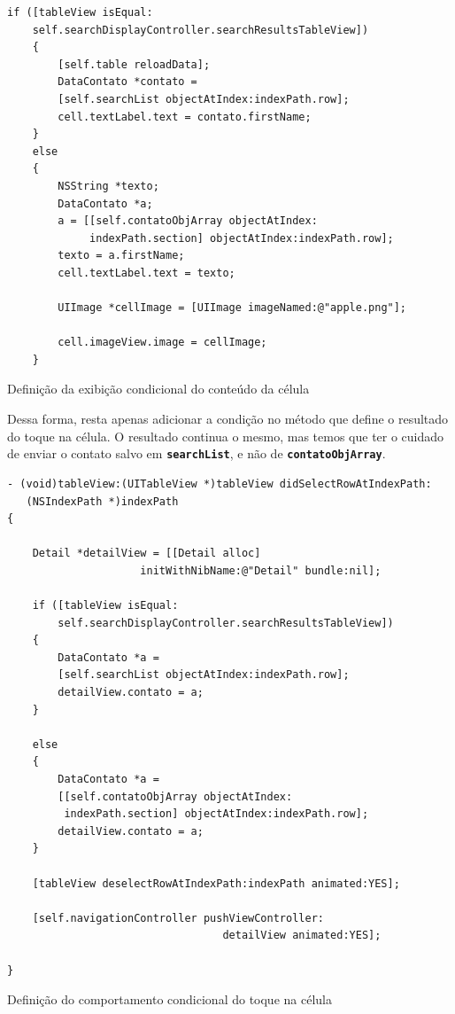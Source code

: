 \documentclass[a4paper,12pt,brazil,oneside]{book}
\begin{document}
\begin{listing}[H]
\begin{verbatim}
if ([tableView isEqual:
    self.searchDisplayController.searchResultsTableView])
    {
        [self.table reloadData];
        DataContato *contato =
        [self.searchList objectAtIndex:indexPath.row];
        cell.textLabel.text = contato.firstName;
    }
    else
    {
        NSString *texto;
        DataContato *a;
        a = [[self.contatoObjArray objectAtIndex:
             indexPath.section] objectAtIndex:indexPath.row];
        texto = a.firstName;
        cell.textLabel.text = texto;
        
        UIImage *cellImage = [UIImage imageNamed:@"apple.png"];
        
        cell.imageView.image = cellImage;
    }
\end{verbatim}
\caption{Definição da exibição condicional do conteúdo da célula}
\end{listing}


Dessa forma, resta apenas adicionar a condição no método que define o resultado do toque na célula. O resultado continua o mesmo, mas temos que ter o cuidado de enviar o contato salvo em \texttt{\textbf{searchList}}, e não de \texttt{\textbf{contatoObjArray}}.

\begin{listing}[H]
\begin{verbatim}
- (void)tableView:(UITableView *)tableView didSelectRowAtIndexPath:
   (NSIndexPath *)indexPath
{

    Detail *detailView = [[Detail alloc]
                     initWithNibName:@"Detail" bundle:nil];
    
    if ([tableView isEqual:
        self.searchDisplayController.searchResultsTableView])
    {
        DataContato *a =
        [self.searchList objectAtIndex:indexPath.row];
        detailView.contato = a;
    }

    else
    {
        DataContato *a =
        [[self.contatoObjArray objectAtIndex:
         indexPath.section] objectAtIndex:indexPath.row];
        detailView.contato = a;
    }
    
    [tableView deselectRowAtIndexPath:indexPath animated:YES];
    
    [self.navigationController pushViewController:
                                  detailView animated:YES];
    
}
\end{verbatim}
\caption{Definição do comportamento condicional do toque na célula}
\end{listing}
\end{document}
